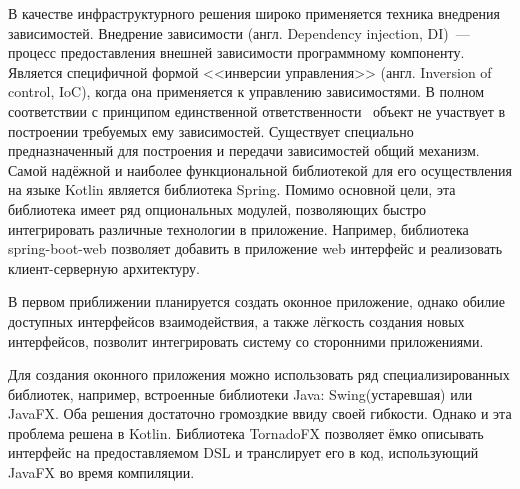 В качестве инфраструктурного решения широко применяется техника внедрения зависимостей.
Внедрение зависимости (англ. Dependency injection, DI)~--- процесс предоставления внешней зависимости программному компоненту. 
Является специфичной формой <<инверсии управления>> (англ. Inversion of control, IoC), когда она применяется к управлению зависимостями. 
В полном соответствии с принципом единственной ответственности~\cite{martin2002agile} объект не участвует в построении требуемых ему зависимостей. 
Существует специально предназначенный для построения и передачи зависимостей общий механизм.
Самой надёжной и наиболее функциональной библиотекой для его осуществления на языке Kotlin является библиотека Spring\cite{reddy2017spring}.
Помимо основной цели, эта библиотека имеет ряд опциональных модулей, позволяющих быстро интегрировать различные технологии в приложение. 
Например, библиотека spring-boot-web позволяет добавить в приложение web интерфейс и реализовать клиент-серверную архитектуру.

В первом приближении планируется создать оконное приложение, однако обилие доступных интерфейсов взаимодействия, а также лёгкость создания новых интерфейсов, позволит интегрировать систему со сторонними приложениями.

Для создания оконного приложения можно использовать ряд специализированных библиотек, например, встроенные библиотеки Java: Swing(устаревшая) или JavaFX.
Оба решения достаточно громоздкие ввиду своей гибкости.
Однако и эта проблема решена в Kotlin. 
Библиотека TornadoFX \cite{dea2017appendix}  позволяет ёмко описывать интерфейс на предоставляемом DSL и транслирует его в код, использующий JavaFX во время компиляции.